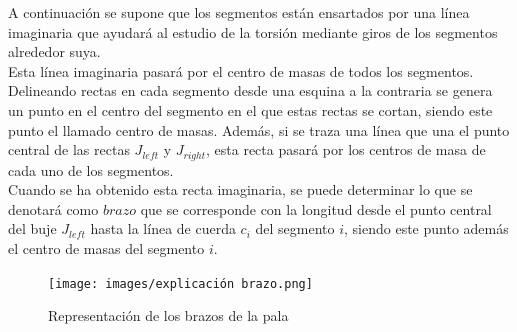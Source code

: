 




A continuación se supone que los segmentos están ensartados por una línea imaginaria que ayudará al estudio de la torsión mediante giros de los segmentos alrededor suya. \\

Esta línea imaginaria pasará por el centro de masas de todos los segmentos. Delineando rectas en cada segmento desde una esquina a la contraria se genera un punto en el centro del segmento en el que estas rectas se cortan, siendo este punto el llamado centro de masas. Además, si se traza una línea que una el punto central de las rectas $J_{left}$ y $J_{right}$, esta recta pasará por los centros de masa de cada uno de los segmentos.\\

Cuando se ha obtenido esta recta imaginaria, se puede determinar lo que se denotará como $brazo$ que se corresponde con la longitud desde el punto central del buje $J_{left}$ hasta la línea de cuerda $c_{i}$ del segmento $i$, siendo este punto además el centro de masas del segmento $i$.


    \begin{figure}[H]
    \centering
    \texttt{[image: images/explicación brazo.png]}
    \caption{Representación de los brazos de la pala}
    \label{fig:exp_brazo}
    
\end{figure}

